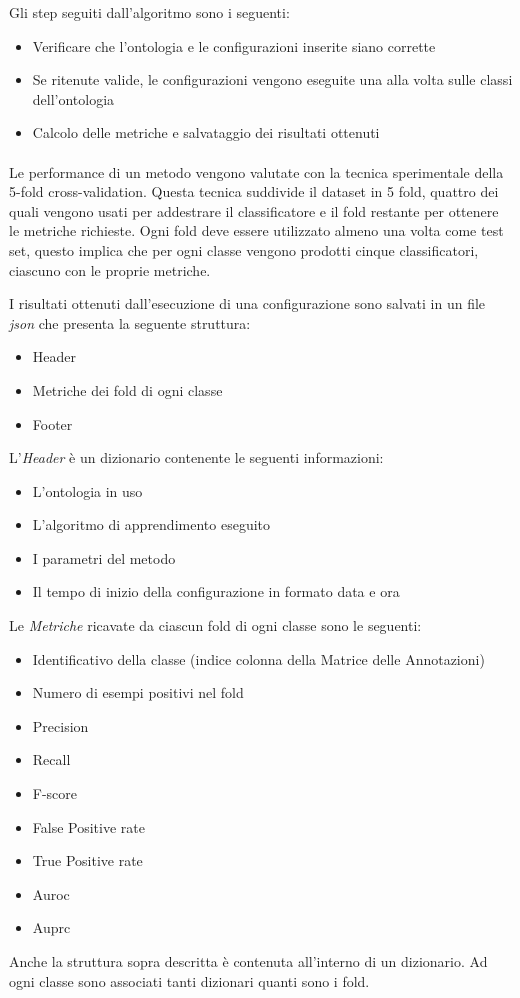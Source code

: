 \documentclass[12pt,a4paper,oneside,hidelinks]{report}
\begin{document}
Gli step seguiti dall'algoritmo sono i seguenti:

\begin{itemize}
    \item Verificare che l'ontologia e le configurazioni inserite siano corrette
    \item Se ritenute valide, le configurazioni vengono eseguite una alla volta sulle classi dell'ontologia
    \item Calcolo delle metriche e salvataggio dei risultati ottenuti
\end{itemize}

\paragraph*{}
Le performance di un metodo vengono valutate con la tecnica sperimentale della 5-fold cross-validation. Questa tecnica suddivide il dataset in 5 fold, quattro dei quali vengono usati per addestrare il classificatore e il fold restante per ottenere le metriche richieste. Ogni fold deve essere utilizzato almeno una volta come test set, questo implica che per ogni classe vengono prodotti cinque classificatori, ciascuno con le proprie metriche.

I risultati ottenuti dall'esecuzione di una configurazione sono salvati in un file \textit{json} che presenta la seguente struttura:

\begin{itemize}
    \item Header
    \item Metriche dei fold di ogni classe
    \item Footer
\end{itemize}
L'\textit{Header} è un dizionario contenente le seguenti informazioni:
\begin{itemize}
    \item L'ontologia in uso
    \item L'algoritmo di apprendimento eseguito
    \item I parametri del metodo
    \item Il tempo di inizio della configurazione in formato data e ora
\end{itemize}
Le \textit{Metriche} ricavate da ciascun fold di ogni classe sono le seguenti:
\begin{itemize}
    \item Identificativo della classe (indice colonna della Matrice delle Annotazioni)
    \item Numero di esempi positivi nel fold
    \item Precision
    \item Recall
    \item F-score
    \item False Positive rate
    \item True Positive rate
    \item Auroc
    \item Auprc
\end{itemize}
Anche la struttura sopra descritta è contenuta all'interno di un dizionario. Ad ogni classe sono associati tanti dizionari quanti sono i fold.
\end{document}
